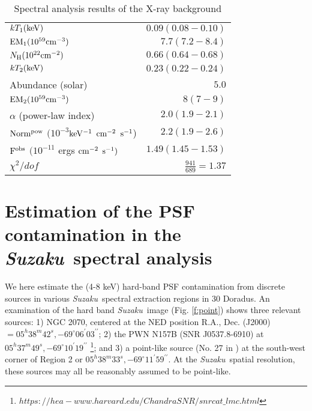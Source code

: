\documentclass[usenatbib]{mnras}
\def\xs{30 Doradus}
\def\suzaku{{\sl Suzaku}}
\begin{document}
\begin{table}%
\caption{Spectral analysis results of the X-ray background}
\label{t:spec_back}
\begin{tabular}{lr}
\hline
$kT_{1}(\rm{keV})$ & $0.09(0.08-0.10)$ \\
$\rm{EM_{1}(10^{59}cm^{-3})}$ & $7.7(7.2-8.4)$ \\
$N_{\rm H} (10^{22}\rm{cm}^{-2})$ & $0.66(0.64-0.68)$ \\
$kT_{2}(\rm{keV})$ & $0.23(0.22-0.24)$ \\
Abundance (solar)& $5.0$  \\
$\rm{EM_{2}(10^{59}cm^{-3})}$ & $8(7-9)$ \\
$\alpha$ (power-law index)& $2.0(1.9-2.1)$ \\
$\rm{Norm^{pow}}$ $(10^{-3}$$\rm{keV^{-1}}$ $\rm{cm^{-2}}$ $\rm{s^{-1}}$)& $2.2(1.9-2.6)$  \\
$\rm{F^{obs}}$ $(10^{-11}$ ergs $\rm{cm^{-2}}$ $\rm{s^{-1})}$ & $1.49(1.45-1.53)$
\\ 
$\chi^2/dof$ & $\frac{941}{689}=1.37$ \\
\hline
\end{tabular}

\end{table}

\section{Estimation of the PSF contamination in the \suzaku\ spectral analysis} %
\label{a:psf}

We here estimate the (4-8 keV) hard-band PSF contamination from discrete sources in various \suzaku\ spectral extraction regions in \xs. 
An examination of the hard band \suzaku\ image (Fig. \ref{f:point}) shows three relevant sources: 1) NGC 2070, centered at the NED position R.A., Dec. (J2000) $= 05^h 38^m 42^s, -69^{\circ}06^{\prime}03^{\prime\prime}$; 2) the PWN N157B (SNR J0537.8-6910) at $05^h 37^m 49^s, -69^{\circ}10^{\prime}19^{\prime\prime}$ \footnote{$https://hea-www.harvard.edu/ChandraSNR/snrcat\_lmc.html$}; and 3) a point-like source  (No. 27 in \citet{Townsley2}) at the south-west corner of Region 2 or $05^h 38^m 33^s, -69^{\circ}11^{\prime}59^{\prime\prime}$.
At the \suzaku\ spatial resolution, these sources may all be reasonably assumed to be point-like. 
\end{document}
